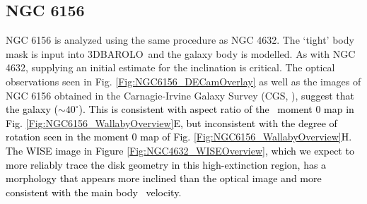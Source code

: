 \documentclass[fleqn,usenatbib]{mnras}
\newcommand{\hi}{\text{H\,\sc{i}}}
\newcommand{\barolo}{\textsc{3DBAROLO}~}
\newcommand{\KS}[1]{\textcolor{black}{#1}}
\begin{document}


\subsection{NGC 6156}\label{SubSec:NGC6156Kinematics}

NGC 6156 is analyzed using the same procedure as NGC 4632.  The `tight' body mask is input into \barolo and the galaxy body is modelled.  As with NGC 4632, supplying an initial estimate for the inclination is critical.  The optical observations seen in Fig. \ref{Fig:NGC6156_DECamOverlay} as well as the images of NGC 6156 obtained in the Carnagie-Irvine Galaxy Survey (CGS, \citealt{Ho2011}), \KS{suggest that the galaxy ($\sim40^{\circ}$).  This is consistent with aspect ratio of the \hi\ moment 0 map in Fig. \ref{Fig:NGC6156_WallabyOverview}E, but inconsistent with the degree of rotation seen in the moment 0 map of Fig. \ref{Fig:NGC6156_WallabyOverview}H.  The WISE image in Figure \ref{Fig:NGC4632_WISEOverview}, which we expect to more reliably trace the disk geometry in this high-extinction region, has a morphology that appears more inclined than the optical image and more consistent with the main body \hi\ velocity.}
\end{document}
